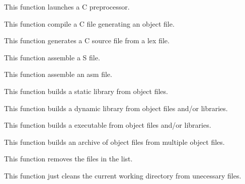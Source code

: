          {This function launches a C preprocessor.}

         {This function compile a C file generating an object file.}

         {This function generates a C source file from a lex file.}

         {This function assemble a S file.}

         {This function assemble an asm file.}

         {This function builds a static library from object files.}

         {This function builds a dynamic library from object files and/or
	   libraries.}

         {This function builds a executable from object files and/or
	   libraries.}

         {This function builds an archive of object files from multiple
	   object files.}

         {This function removes the files in the list.}

         {This function just cleans the current working directory from
	   unecessary files.}


